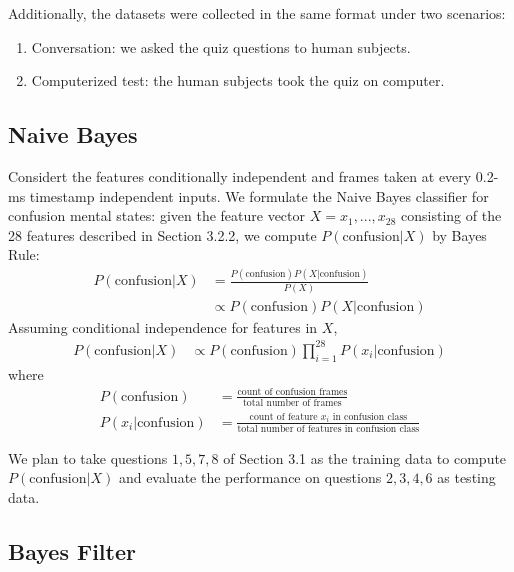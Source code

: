 \documentclass[12pt,letterpaper]{article}
\begin{document}

Additionally, the datasets were collected in the same format under two scenarios: 
\begin{enumerate}
\item Conversation: we asked the quiz questions to human subjects.
\item Computerized test: the human subjects took the quiz on computer.
\end{enumerate}


\subsection{Naive Bayes}
Considert the features conditionally independent and frames taken at every 0.2-ms timestamp independent inputs. We formulate the Naive Bayes classifier for confusion mental states: given the feature vector $X = {x_1, ... , x_{28}}$ consisting of the 28 features described in Section 3.2.2, we compute $P(\text{confusion}|X)$ by Bayes Rule:
\begin{align}
P(\text{confusion}|X) &= \frac{P(\text{confusion}) P(X|\text{confusion}) }{P(X)} \\
&\propto P(\text{confusion}) P(X|\text{confusion})
\end{align}
Assuming conditional independence for features in $X$, 
\begin{align}
P(\text{confusion}|X) &\propto P(\text{confusion}) \prod_{i=1}^{28} P(x_i | \text{confusion})
\end{align}
where
\begin{align}
P(\text{confusion}) &= \frac{ \text{count of confusion frames} }{ \text{total number of frames} } \\
P(x_i|\text{confusion}) &= \frac{ \text{count of feature $x_i$ in confusion class} }{ \text{total number of features in confusion class} } 
\end{align}

We plan to take questions $1,5,7,8$ of Section 3.1 as the training data to compute $P(\text{confusion}|X)$ and evaluate the performance on questions $2,3,4,6$ as testing data. 
\subsection{Bayes Filter}
\end{document}
